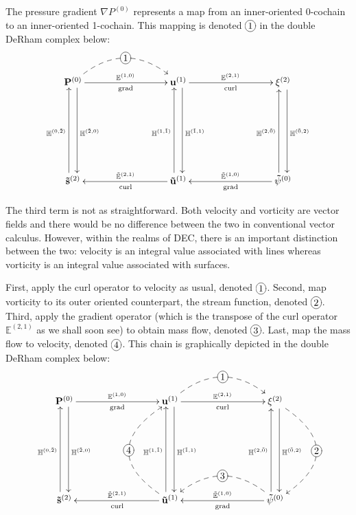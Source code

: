 The pressure gradient $\nabla P^{(0)}$ represents a map from an inner-oriented 0-cochain to an inner-oriented 1-cochain. This mapping is denoted $\xymatrix{*+[o][F-]{1}}$  in the double DeRham complex below:
\begin{equation}
    \begin{gathered}
        \xymatrix@=20ex{
            \mathbf{P}^{(0)} \ar[r]^{\mathbb{E}^{(1,0)}}_{\text{grad}} \ar@<1ex>[d]^{\mathbb{H}^{(\tilde{2},0)}} \ar @/^6ex/ @{-->} [r]|-*+[o][F-]{1}  & \mathbf{u}^{(1)} \ar[r]^{\mathbb{E}^{(2,1)}}_{\text{curl}} \ar@<1ex>[d]^{\mathbb{H}^{(\tilde{1},1)}} & \mathbf{\xi}^{(2)} \ar@<1ex>[d]^{\mathbb{H}^{(\tilde{0},2)}} \\
            \mathbf{\tilde{s}}^{(2)} \ar@<1ex>[u]^{\mathbb{H}^{(0,\tilde{2})}} & \mathbf{\tilde{u}}^{(1)} \ar[l]_{\tilde{\mathbb{E}}^{(2, 1)}}^{\text{curl}} \ar@<1ex>[u]^{\mathbb{H}^{(1,\tilde{1})}} & \mathbf{\tilde{\psi}}^{(0)} \ar[l]_{\tilde{\mathbb{E}}^{(1,0)}}^{\text{grad}} \ar@<1ex>[u]^{\mathbb{H}^{(2,\tilde{0})}}
        }
    \end{gathered}
    \label{eq:DeRhamPressure}
\end{equation}

The third term is not as straightforward. Both velocity and vorticity are vector fields and there would be no difference between the two in conventional vector calculus. However, within the realms of DEC, there is an important distinction between the two: velocity is an integral value associated with lines whereas vorticity is an integral value associated with surfaces.

First, apply the curl operator to velocity as usual, denoted $\xymatrix{*+[o][F-]{1}}$. Second, map vorticity to its outer oriented counterpart, the stream function, denoted $\xymatrix{*+[o][F-]{2}}$. Third, apply the gradient operator (which is the transpose of the curl operator $\mathbb{E}^{(2,1)}$ as we shall soon see) to obtain mass flow, denoted $\xymatrix{*+[o][F-]{3}}$. Last, map the mass flow to velocity, denoted $\xymatrix{*+[o][F-]{4}}$. This chain is graphically depicted in the double DeRham complex below:
\begin{equation}
    \begin{gathered}
        \xymatrix@=20ex{
            \mathbf{P}^{(0)} \ar[r]^{\mathbb{E}^{(1,0)}}_{\text{grad}} \ar@<1ex>[d]^{\mathbb{H}^{(\tilde{2},0)}} & \mathbf{u}^{(1)} \ar[r]^{\mathbb{E}^{(2,1)}}_{\text{curl}} \ar @/^6ex/ @{-->} [r]|-*+[o][F-]{1} \ar@<1ex>[d]^{\mathbb{H}^{(\tilde{1},1)}} & \mathbf{\xi}^{(2)} \ar@<1ex>[d]^{\mathbb{H}^{(\tilde{0},2)}} \ar @/^10ex/ @{-->} [d]|-*+[o][F-]{2} \\
            \mathbf{\tilde{s}}^{(2)} \ar@<1ex>[u]^{\mathbb{H}^{(0,\tilde{2})}} & \mathbf{\tilde{u}}^{(1)} \ar[l]_{\tilde{\mathbb{E}}^{(2, 1)}}^{\text{curl}} \ar@<1ex>[u]^{\mathbb{H}^{(1,\tilde{1})}} \ar @/^10ex/ @{-->} [u]|-*+[o][F-]{4} & \mathbf{\tilde{\psi}}^{(0)} \ar[l]_{\tilde{\mathbb{E}}^{(1,0)}}^{\text{grad}} \ar @/_6ex/ @{-->} [l]|-*+[o][F-]{3} \ar@<1ex>[u]^{\mathbb{H}^{(2,\tilde{0})}}
        }
    \end{gathered}
\end{equation}

